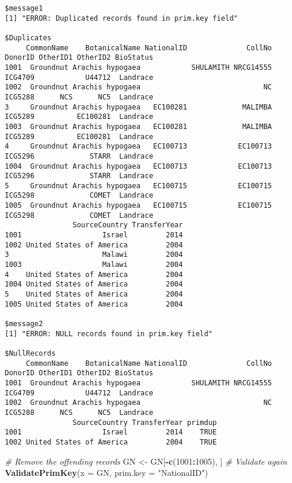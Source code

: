 \documentclass[
]{article}
\newenvironment{Shaded}{\begin{snugshade}}{\end{snugshade}}
\newcommand{\CommentTok}[1]{\textcolor[rgb]{0.56,0.35,0.01}{\textit{#1}}}
\newcommand{\DataTypeTok}[1]{\textcolor[rgb]{0.13,0.29,0.53}{#1}}
\newcommand{\DecValTok}[1]{\textcolor[rgb]{0.00,0.00,0.81}{#1}}
\newcommand{\KeywordTok}[1]{\textcolor[rgb]{0.13,0.29,0.53}{\textbf{#1}}}
\newcommand{\NormalTok}[1]{#1}
\newcommand{\OperatorTok}[1]{\textcolor[rgb]{0.81,0.36,0.00}{\textbf{#1}}}
\newcommand{\StringTok}[1]{\textcolor[rgb]{0.31,0.60,0.02}{#1}}
\begin{document}
\begin{verbatim}
$message1
[1] "ERROR: Duplicated records found in prim.key field"

$Duplicates
     CommonName    BotanicalName NationalID              CollNo DonorID OtherID1 OtherID2 BioStatus
1001  Groundnut Arachis hypogaea            SHULAMITH NRCG14555 ICG4709            U44712  Landrace
1002  Groundnut Arachis hypogaea                             NC ICG5288      NCS      NC5  Landrace
3     Groundnut Arachis hypogaea   EC100281             MALIMBA ICG5289          EC100281  Landrace
1003  Groundnut Arachis hypogaea   EC100281             MALIMBA ICG5289          EC100281  Landrace
4     Groundnut Arachis hypogaea   EC100713            EC100713 ICG5296             STARR  Landrace
1004  Groundnut Arachis hypogaea   EC100713            EC100713 ICG5296             STARR  Landrace
5     Groundnut Arachis hypogaea   EC100715            EC100715 ICG5298             COMET  Landrace
1005  Groundnut Arachis hypogaea   EC100715            EC100715 ICG5298             COMET  Landrace
                SourceCountry TransferYear
1001                   Israel         2014
1002 United States of America         2004
3                      Malawi         2004
1003                   Malawi         2004
4    United States of America         2004
1004 United States of America         2004
5    United States of America         2004
1005 United States of America         2004

$message2
[1] "ERROR: NULL records found in prim.key field"

$NullRecords
     CommonName    BotanicalName NationalID              CollNo DonorID OtherID1 OtherID2 BioStatus
1001  Groundnut Arachis hypogaea            SHULAMITH NRCG14555 ICG4709            U44712  Landrace
1002  Groundnut Arachis hypogaea                             NC ICG5288      NCS      NC5  Landrace
                SourceCountry TransferYear primdup
1001                   Israel         2014    TRUE
1002 United States of America         2004    TRUE
\end{verbatim}

\begin{Shaded}
\begin{Highlighting}[]
\CommentTok{# Remove the offending records}
\NormalTok{GN <-}\StringTok{ }\NormalTok{GN[}\OperatorTok{-}\KeywordTok{c}\NormalTok{(}\DecValTok{1001}\OperatorTok{:}\DecValTok{1005}\NormalTok{), ]}
\CommentTok{# Validate again}
\KeywordTok{ValidatePrimKey}\NormalTok{(}\DataTypeTok{x =}\NormalTok{ GN, }\DataTypeTok{prim.key =} \StringTok{"NationalID"}\NormalTok{)}
\end{Highlighting}
\end{Shaded}
\end{document}
